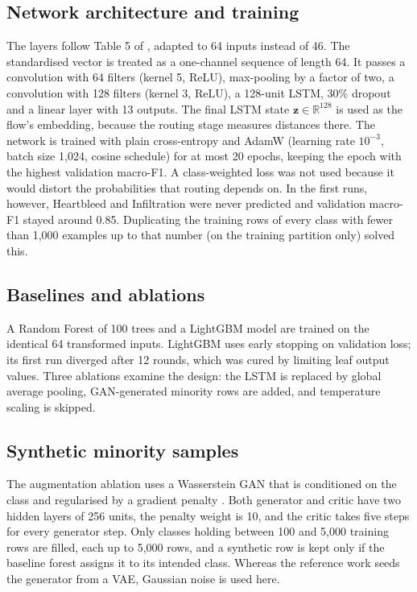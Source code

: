 \documentclass[conference]{IEEEtran}
\begin{document}
\subsection{Network architecture and training}
The layers follow Table 5 of \cite{refpaper2025}, adapted to 64 inputs instead of 46. The
standardised vector is treated as a one-channel sequence of length 64. It passes a convolution with
64 filters (kernel 5, ReLU), max-pooling by a factor of two, a convolution with 128 filters (kernel
3, ReLU), a 128-unit LSTM, 30\% dropout and a linear layer with 13 outputs. The final LSTM state
$\mathbf{z}\in\mathbb{R}^{128}$ is used as the flow's embedding, because the routing stage measures
distances there. The network is trained with plain cross-entropy and AdamW (learning rate
$10^{-3}$, batch size 1,024, cosine schedule) for at most 20 epochs, keeping the epoch with the
highest validation macro-F1. A class-weighted loss was not used because it would distort the
probabilities that routing depends on. In the first runs, however, Heartbleed and Infiltration were
never predicted and validation macro-F1 stayed around 0.85. Duplicating the training rows of every
class with fewer than 1,000 examples up to that number (on the training partition only) solved this.

\subsection{Baselines and ablations}
A Random Forest of 100 trees and a LightGBM model are trained on the identical 64 transformed
inputs. LightGBM uses early stopping on validation loss; its first run diverged after 12 rounds,
which was cured by limiting leaf output values. Three ablations examine the design: the LSTM is
replaced by global average pooling, GAN-generated minority rows are added, and temperature scaling
is skipped.

\subsection{Synthetic minority samples}
The augmentation ablation uses a Wasserstein GAN that is conditioned on the class and
regularised by a gradient penalty \cite{mirza2014conditional,gulrajani2017improved}. Both generator and critic have two hidden layers
of 256 units, the penalty weight is 10, and the critic takes five steps for every generator step.
Only classes holding between 100 and 5,000 training rows are filled, each up to 5,000 rows, and a
synthetic row is kept only if the baseline forest assigns it to its intended class. Whereas the
reference work seeds the generator from a VAE, Gaussian noise is used here.
\end{document}

